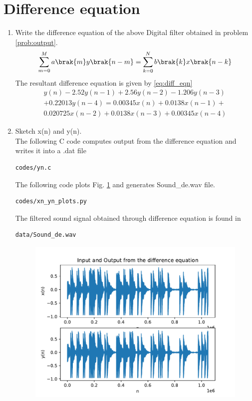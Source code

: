 \documentclass[journal,12pt,twocolumn]{IEEEtran}
\renewcommand\thesection{\arabic{section}}
\begin{document}
\section{Difference equation}
\begin{enumerate}[label=\thesection.\arabic*,ref=\thesection.\theenumi]
\item
\label{prob:diff_eq}
Write the difference equation of the above Digital filter obtained in problem \ref{prob:output}.
\\
\solution
\begin{align}
\label{eq:iir_filter_gen}
 \sum _{m=0}^{M}a\brak{m}y\brak{n-m}=\sum _{k=0}^{N}b\brak{k}x\brak{n-k}
\end{align}
The resultant difference equation is given by \eqref{eq:diff_eqn}
\begin{align}
\label{eq:diff_eqn}
y(n) - 2.52y(n-1) + 2.56y(n-2) - 1.206y(n-3)
\nonumber\\
+ 0.22013y(n-4) = 0.00345x(n) + 0.0138x(n-1) +
\nonumber\\
 0.020725x(n-2) + 0.0138x(n-3) + 0.00345x(n-4)
\end{align}
\item
\label{prob:xnyn_plot1}
Sketch x(n) and y(n).
\\
\solution
The following C code computes output from the difference equation and writes it into a .dat file
\begin{lstlisting}
codes/yn.c
\end{lstlisting}
The following code plots Fig. \ref{fig:xnyn} and generates Sound\_de.wav file.
\begin{lstlisting}
codes/xn_yn_plots.py
\end{lstlisting}
The filtered sound signal obtained through difference equation is found in
\begin{lstlisting}
data/Sound_de.wav
\end{lstlisting}
\begin{figure}[!ht]
\begin{center}
\includegraphics[width=\columnwidth]{./figs/xn_yn}
\end{center}
\label{fig:xnyn}	
\end{figure}
\end{enumerate}
\end{document}

